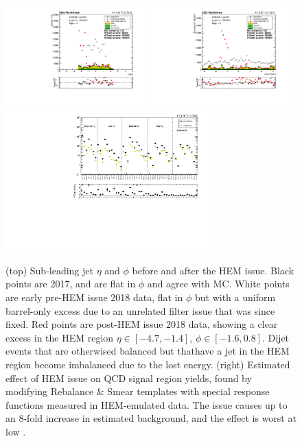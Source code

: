\begin{figure}[t]
  \begin{center}
    \includegraphics[width=0.48\textwidth]{figs/event_selection/hem_subleadjeteta.pdf}
    \includegraphics[width=0.48\textwidth]{figs/event_selection/hem_subleadjetphi.pdf} \\
    \includegraphics[width=0.70\textwidth]{figs/event_selection/mc_closure_sr.pdf}
    \caption{(top) Sub-leading jet $\eta$ and $\phi$ before and after the HEM issue.
      Black points are 2017, and are flat in $\phi$ and agree with MC. White
      points are early pre-HEM issue 2018 data, flat in $\phi$ but with 
      a uniform barrel-only excess due to an unrelated filter issue that was since fixed.
      Red points are post-HEM issue 2018 data, showing a clear excess in the HEM region
      $\eta\in[-4.7,-1.4]$, $\phi\in[-1.6,0.8]$. Dijet events that are otherwised 
      balanced but thathave a jet in
      the HEM region become imbalanced due to the lost energy.
      (right) Estimated effect of HEM issue on QCD signal region yields, found by 
      modifying Rebalance \& Smear templates with special response functions measured
      in HEM-emulated data. The issue causes up to an 8-fold increase in estimated
      background, and the effect is worst at low \Ht.
            }
    \label{fig:hem}
  \end{center}
\end{figure}
